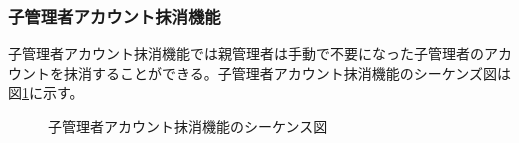 \documentclass[a4j]{jarticle}
\begin{document}
 \subsubsection{子管理者アカウント抹消機能}
 子管理者アカウント抹消機能では親管理者は手動で不要になった子管理者のアカウントを抹消することができる。子管理者アカウント抹消機能のシーケンズ図は図\ref{fig:admin_children-delete.png}に示す。
          \begin{figure}[H]
\centering
{}
\caption{子管理者アカウント抹消機能のシーケンス図}
\label{fig:admin_children-delete.png}
\end{figure}
 
\end{document}
